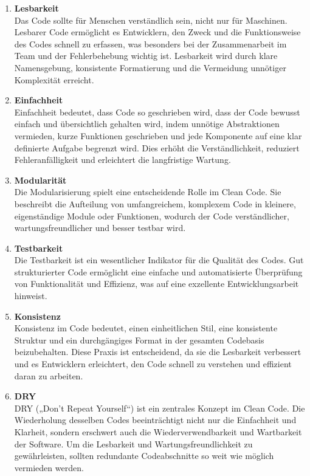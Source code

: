 \documentclass[conference]{IEEEtran}
\begin{document}
\begin{enumerate}
    \item \textbf{Lesbarkeit}\\
    Das Code sollte für Menschen verständlich sein, nicht nur für Maschinen. Lesbarer Code ermöglicht es Entwicklern, den Zweck und die Funktionsweise des Codes schnell zu erfassen, was besonders bei der Zusammenarbeit im Team und der Fehlerbehebung wichtig ist. Lesbarkeit wird durch klare Namensgebung, konsistente Formatierung und die Vermeidung unnötiger Komplexität erreicht.
    
    \item \textbf{Einfachheit}\\
    Einfachheit bedeutet, dass Code so geschrieben wird, dass der Code bewusst einfach und übersichtlich gehalten wird, indem unnötige Abstraktionen vermieden, kurze Funktionen geschrieben und jede Komponente auf eine klar definierte Aufgabe begrenzt wird. Dies erhöht die Verständlichkeit, reduziert Fehleranfälligkeit und erleichtert die langfristige Wartung.
    
    \item \textbf{Modularität}\\
    Die Modularisierung spielt eine entscheidende Rolle im Clean Code. Sie beschreibt die Aufteilung von umfangreichem, komplexem Code in kleinere, eigenständige Module oder Funktionen, wodurch der Code verständlicher, wartungsfreundlicher und besser testbar wird.
    
    \item \textbf{Testbarkeit}\\
    Die Testbarkeit ist ein wesentlicher Indikator für die Qualität des Codes. Gut strukturierter Code ermöglicht eine einfache und automatisierte Überprüfung von Funktionalität und Effizienz, was auf eine exzellente Entwicklungsarbeit hinweist.
    \item \textbf{Konsistenz}\\
    Konsistenz im Code bedeutet, einen einheitlichen Stil, eine konsistente Struktur und ein durchgängiges Format in der gesamten Codebasis beizubehalten. Diese Praxis ist entscheidend, da sie die Lesbarkeit verbessert und es Entwicklern erleichtert, den Code schnell zu verstehen und effizient daran zu arbeiten.
    
    \item \textbf{DRY}\\
    DRY („Don't Repeat Yourself“) ist ein zentrales Konzept im Clean Code. Die Wiederholung desselben Codes beeinträchtigt nicht nur die Einfachheit und Klarheit, sondern erschwert auch die Wiederverwendbarkeit und Wartbarkeit der Software. Um die Lesbarkeit und Wartungsfreundlichkeit zu gewährleisten, sollten redundante Codeabschnitte so weit wie möglich vermieden werden.
   


\end{enumerate}
\end{document}
